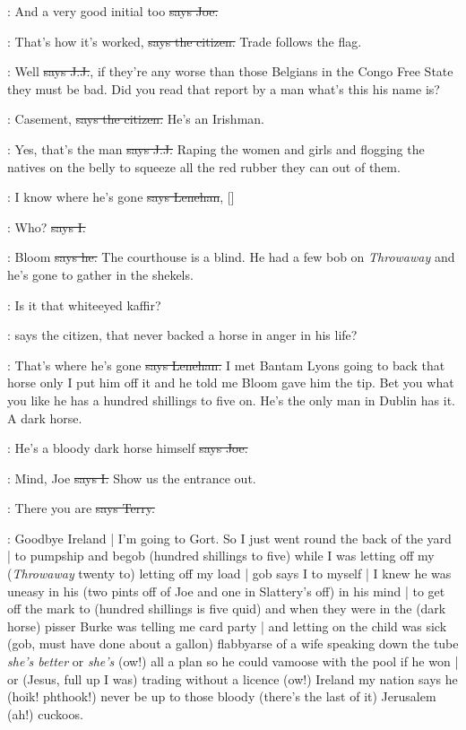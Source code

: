 \joe:
And a very good initial too
\sout{says Joe.}

\citizen:
That's how it's worked,
\sout{says the citizen.}
Trade follows the flag.

\jjom:
Well
\sout{says J.J.},
if they're any worse than those Belgians in the Congo Free State
they must be bad.
Did you read that report by a man what's this his name is?

\citizen:
Casement,
\sout{says the citizen.}
He's an Irishman.

\jjom:
Yes,
that's the man
\sout{says J.J.}
Raping the women and girls and flogging
the natives on the belly to squeeze all the red rubber they can out of them.

\lenehan:
I know where he's gone
\sout{says Lenehan},
[]

:
Who?
\sout{says I.}

\lenehan:
Bloom
\sout{says he.}
The courthouse is a blind.
He had a few bob on \emph{Throwaway} and he's gone to gather in the shekels.

\citizen:
Is it that whiteeyed kaffir?

\Nq:
says the citizen,
that never backed a horse
in anger in his life?

\lenehan:
That's where he's gone
\sout{says Lenehan.}
I met Bantam Lyons going to back
that horse only I put him off it and he told me Bloom gave him the tip.
Bet you what you like he has a hundred shillings to five on.
He's the only man in Dublin has it.
A dark horse.

\joe:
He's a bloody dark horse himself
\sout{says Joe.}

:
Mind,
Joe
\sout{says I.}
Show us the entrance out.

\terry:
There you are
\sout{says Terry.}

\Nq:
Goodbye Ireland |
I'm going to Gort.
So I just went round the back of the yard |
to pumpship and begob
(hundred shillings to five)
while I was letting off my
(\emph{Throwaway} twenty to)
letting off my load |
gob says I to myself |
I knew he was uneasy in his
(two pints off of Joe and one in Slattery's off)
in his mind |
to get off the mark to
(hundred shillings is five quid)
and when they were in the
(dark horse)
pisser Burke
was telling me card party |
and letting on the child was sick
(gob,
must have done about a gallon)
flabbyarse of a wife speaking down the tube
\emph{she's better} or \emph{she's}
(ow!)
all a plan so he could vamoose with the pool if he won |
or
(Jesus,
full up I was)
trading without a licence
(ow!)
Ireland my nation says he
(hoik!
phthook!)
never be up to those bloody
(there's the last of it)
Jerusalem
(ah!)
cuckoos.


